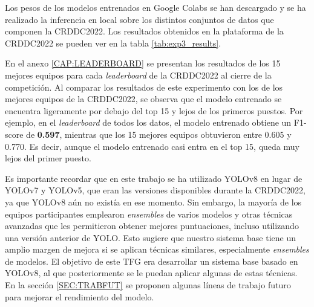 Los pesos de los modelos entrenados en Google Colabs se han descargado y se ha realizado la inferencia en local sobre los distintos conjuntos de datos que componen la CRDDC2022. Los resultados obtenidos en la plataforma de la CRDDC2022 se pueden ver en la tabla \ref{tab:exp3_results}.

\begin{table}[H]
    \centering
    \caption{F1-scores obtenidos en la plataforma de la CRDDC2022 para los distintos conjuntos de datos.}
    \label{tab:exp3_results}
\end{table}

En el anexo \ref{CAP:LEADERBOARD} se presentan los resultados de los 15 mejores equipos para cada \textit{leaderboard} de la CRDDC2022 al cierre de la competición. Al comparar los resultados de este experimento con los de los mejores equipos de la CRDDC2022, se observa que el modelo entrenado se encuentra ligeramente por debajo del top 15 y lejos de los primeros puestos. Por ejemplo, en el \textit{leaderboard} de todos los datos, el modelo entrenado obtiene un F1-score de \textbf{0.597}, mientras que los 15 mejores equipos obtuvieron entre 0.605 y 0.770. Es decir, aunque el modelo entrenado casi entra en el top 15, queda muy lejos del primer puesto.

Es importante recordar que en este trabajo se ha utilizado YOLOv8 en lugar de YOLOv7 y YOLOv5, que eran las versiones disponibles durante la CRDDC2022, ya que YOLOv8 aún no existía en ese momento. Sin embargo, la mayoría de los equipos participantes emplearon \textit{ensembles} de varios modelos y otras técnicas avanzadas que les permitieron obtener mejores puntuaciones, incluso utilizando una versión anterior de YOLO. Esto sugiere que nuestro sistema base tiene un amplio margen de mejora si se aplican técnicas similares, especialmente \textit{ensembles} de modelos. El objetivo de este TFG era desarrollar un sistema base basado en YOLOv8, al que posteriormente se le puedan aplicar algunas de estas técnicas. En la sección \ref{SEC:TRABFUT} se proponen algunas líneas de trabajo futuro para mejorar el rendimiento del modelo.

